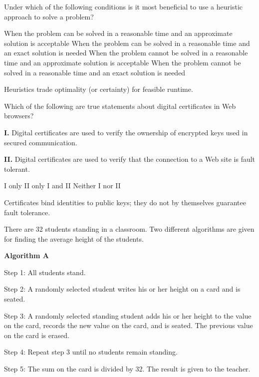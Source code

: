 \question[5]
Under which of the following conditions is it most beneficial to use a heuristic approach to solve a problem?
\begin{choices}
  \choice When the problem can be solved in a reasonable time and an approximate solution is acceptable
  \choice When the problem can be solved in a reasonable time and an exact solution is needed
  \CorrectChoice When the problem cannot be solved in a reasonable time and an approximate solution is acceptable
  \choice When the problem cannot be solved in a reasonable time and an exact solution is needed
\end{choices}
\begin{solution}
  Heuristics trade optimality (or certainty) for feasible runtime.
\end{solution}

\question[5]
Which of the following are true statements about digital certificates in Web browsers?

\textbf{I.} Digital certificates are used to verify the ownership of encrypted keys used in secured communication.

\textbf{II.} Digital certificates are used to verify that the connection to a Web site is fault tolerant.
\begin{choices}
  \CorrectChoice I only
  \choice II only
  \choice I and II
  \choice Neither I nor II
\end{choices}
\begin{solution}
  Certificates bind identities to public keys; they do not by themselves guarantee fault tolerance.
\end{solution}

\newpage

\question[5]
There are 32 students standing in a classroom. Two different algorithms are given for finding the average height of the students.

\textbf{Algorithm A}

Step 1: All students stand.

Step 2: A randomly selected student writes his or her height on a card and is seated.

Step 3: A randomly selected standing student adds his or her height to the value on the card, records the new value on the card, and is seated. The previous value on the card is erased.

Step 4: Repeat step 3 until no students remain standing.

Step 5: The sum on the card is divided by 32. The result is given to the teacher.

